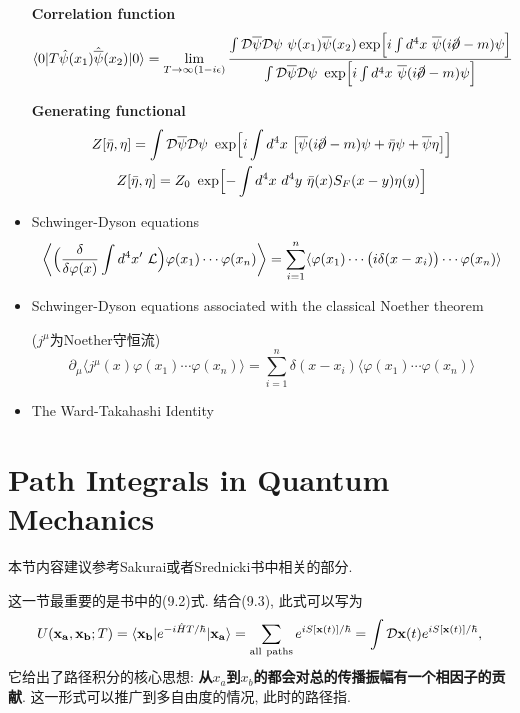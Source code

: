 \begin{itemize}
        \textbf{Correlation function}
        \begin{equation*}
          \langle 0|T\hat{\psi}(x_1)\hat{\overline{\psi}}(x_2)|0 \rangle = \lim_{T\rightarrow \infty(1-i\epsilon)}\frac{\int \mathcal{D}\overline{\psi} \mathcal{D}\psi\ \psi(x_1)\overline{\psi}(x_2) \exp\Bigl[i\int d^4x\ \overline{\psi}(i\cancel{\partial}-m)\psi\Bigr]}{\int \mathcal{D}\overline{\psi} \mathcal{D}\psi\ \exp\Bigl[i\int d^4x\ \overline{\psi}(i\cancel{\partial}-m)\psi\Bigr]}
        \end{equation*}

        \textbf{Generating functional}
        \begin{gather*}
          Z[\bar{\eta}, \eta] = \int \mathcal{D}\overline{\psi} \mathcal{D}\psi\ \exp\Bigl[i\int d^4x\ \bigl[\overline{\psi}(i\cancel{\partial}-m)\psi + \bar{\eta}\psi + \overline{\psi}\eta\bigr]\Bigr] \\
          Z[\bar{\eta}, \eta] = Z_0\ \exp\Bigl[-\int d^4x\ d^4y\ \bar{\eta}(x)S_F(x-y)\eta(y)\Bigr]
        \end{gather*}
  \item Schwinger-Dyson equations
        \begin{equation*}
          \biggl\langle\Bigl(\frac{\delta}{\delta\varphi(x)}\int d^4x'\ \mathcal{L}\Bigr) \varphi(x_1)\cdots \varphi(x_n)\biggr\rangle = \sum_{i=1}^{n}\langle\varphi(x_1)\cdots \bigl(i\delta(x-x_i)\bigr)\cdots\varphi(x_n) \rangle
        \end{equation*}
  \item Schwinger-Dyson equations associated with the classical Noether theorem

        ($j^\mu$为Noether守恒流)
        \begin{equation*}
          \partial_\mu \langle j^\mu(x) \varphi(x_1)\cdots\varphi(x_n)\rangle = \sum_{i=1}^{n}\delta(x-x_i)\langle\varphi(x_1)\cdots\varphi(x_n)\rangle
        \end{equation*}
  \item The Ward-Takahashi Identity

\end{itemize}
\pagestyle{general}

\section{Path Integrals in Quantum Mechanics}
本节内容建议参考Sakurai或者Srednicki书中相关的部分.

这一节最重要的是书中的(9.2)式.
结合(9.3), 此式可以写为
\begin{equation}\label{eq: path_nonfield}
  U(\mathbf{x_a},\mathbf{x_b};T)=\langle \mathbf{x_b}|e^{-i\hat{H}T/\hbar}|\mathbf{x_a} \rangle = \sum_{\rm all\ paths} e^{iS[\mathbf{x}(t)]/\hbar} = \int \mathcal{D}\mathbf{x}(t)e^{iS[\mathbf{x}(t)]/\hbar},
\end{equation}
它给出了路径积分的核心思想: \textbf{从$x_a$到$x_b$的都会对总的传播振幅有一个相因子的贡献}.
这一形式可以推广到多自由度的情况, 此时的路径指.

